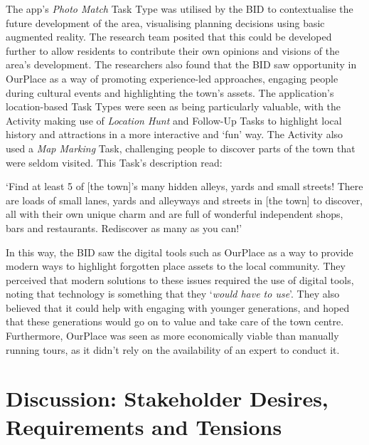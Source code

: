 The app's \textit{Photo Match} Task Type was utilised by the BID to contextualise the future development of the area, visualising planning decisions using basic augmented reality. The research team posited that this could be developed further to allow residents to contribute their own opinions and visions of the area's development. The researchers also found that the BID saw opportunity in OurPlace as a way of promoting experience-led approaches, engaging people during cultural events and highlighting the town's assets. The application's location-based Task Types were seen as being particularly valuable, with the Activity making use of \textit{Location Hunt} and Follow-Up Tasks to highlight local history and attractions in a more interactive and `fun' way. The Activity also used a \textit{Map Marking} Task, challenging people to discover parts of the town that were seldom visited. This Task's description read:

\begin{displayquote}
`Find at least 5 of [the town]'s many hidden alleys, yards and small streets! There are loads of small lanes, yards and alleyways and streets in [the town] to discover, all with their own unique charm and are full of wonderful independent shops, bars and restaurants. Rediscover as many as you can!'
\end{displayquote}

In this way, the BID saw the digital tools such as OurPlace as a way to provide modern ways to highlight forgotten place assets to the local community. They perceived that modern solutions to these issues required the use of digital tools, noting that technology is something that they `\textit{would have to use}'. They also believed that it could help with engaging with younger generations, and hoped that these generations would go on to value and take care of the town centre. Furthermore, OurPlace was seen as more economically viable than manually running tours, as it didn't rely on the availability of an expert to conduct it.

\section{Discussion: Stakeholder Desires, Requirements and Tensions}

